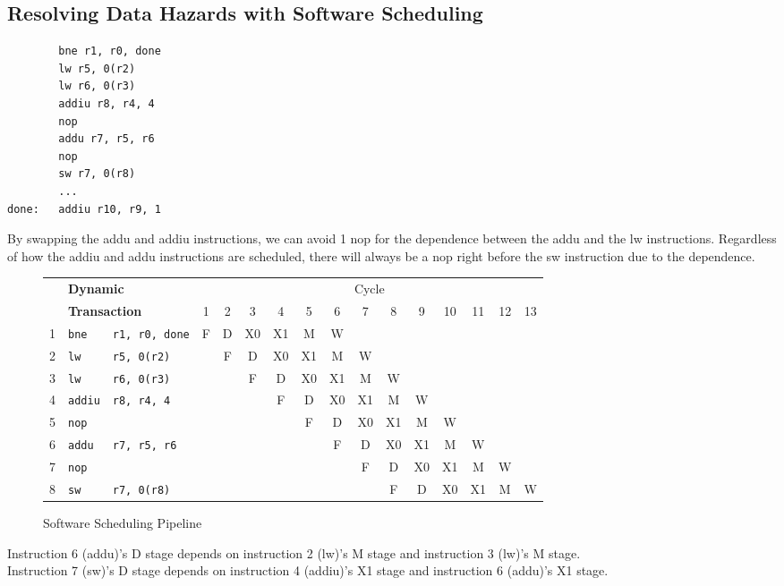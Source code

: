 \documentclass[10pt]{article}
\begin{document}
\subsection{Resolving Data Hazards with Software Scheduling}
\begin{lstlisting}
        bne r1, r0, done
        lw r5, 0(r2)
        lw r6, 0(r3)
        addiu r8, r4, 4
        nop
        addu r7, r5, r6
        nop
        sw r7, 0(r8)
        ...
done:   addiu r10, r9, 1
\end{lstlisting}
By swapping the addu and addiu instructions, we can avoid 1 nop for the dependence between the addu and the lw instructions. Regardless of how the addiu and addu instructions are scheduled, there will always be a nop right before the sw instruction due to the dependence.
\begin{figure}[H]
\centering
\begin{tabular}{cll|c|c|c|c|c|c|c|c|c|c|c|c|c}
\hline
& \multicolumn{2}{l}{\textbf{Dynamic}} & \multicolumn{13}{c}{Cycle} \\
& \multicolumn{2}{l}{\textbf{Transaction}} & 1 & 2 & 3 & 4 & 5 & 6 & 7 & 8 & 9 & 10 & 11 & 12 & 13 \\
\hline
1 & \texttt{bne} & \texttt{r1, r0, done} & F & D & X0 & X1 & M & W & & & & & & &\\
\hline
2 & \texttt{lw} & \texttt{r5, 0(r2)} & & F & D & X0 & X1 & M & W & & & & & &\\
\hline
3 & \texttt{lw} & \texttt{r6, 0(r3)} & & & F & D & X0 & X1 & M & W & & & & &\\
\hline
4 & \texttt{addiu} & \texttt{r8, r4, 4} & & & & F & D & X0 & X1 & M & W & & & &\\
\hline
5 & \texttt{nop} & & & & & & F & D & X0 & X1 & M & W & & &\\
\hline
6 & \texttt{addu} & \texttt{r7, r5, r6} & & & & & & F & D & X0 & X1 & M & W & &\\
\hline
7 & \texttt{nop} & & & & & & & & F & D & X0 & X1 & M & W &\\
\hline
8 & \texttt{sw} & \texttt{r7, 0(r8)} & & & & & & & & F & D & X0 & X1 & M & W \\
\hline
\end{tabular}
\caption{Software Scheduling Pipeline}
\label{fig:sixstage_softwaresch_pipe_diagram}
\end{figure}
Instruction 6 (addu)'s D stage depends on instruction 2 (lw)'s M stage and instruction 3 (lw)'s M stage.\\
Instruction 7 (sw)'s D stage depends on instruction 4 (addiu)'s X1 stage and instruction 6 (addu)'s X1 stage.\\
\end{document}
